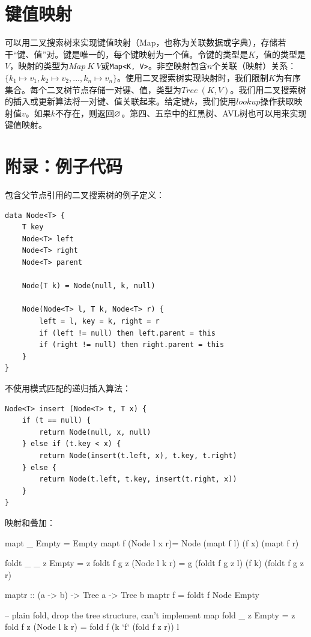 \documentclass[b5paper]{ctexart}
\begin{document}
\begin{Exercise}
\end{Exercise}

\section{键值映射}
可以用二叉搜索树来实现键值映射（Map，也称为关联数据或字典），存储若干“键、值”对。键是唯一的，每个键映射为一个值。令键的类型是$K$，值的类型是$V$，映射的类型为$Map\ K\ V$或\texttt{Map<K, V>}。非空映射包含$n$个关联（映射）关系：$\{k_1 \mapsto v_1, k_2 \mapsto v_2, ..., k_n \mapsto v_n\}$。使用二叉搜索树实现映射时，我们限制$K$为有序集合。每个二叉树节点存储一对键、值，类型为$Tree\ (K, V)$。我们用二叉搜索树的插入或更新算法将一对键、值关联起来。给定键$k$，我们使用$lookup$操作获取映射值$v$。如果$k$不存在，则返回$\varnothing$。第四、五章中的红黑树、AVL树也可以用来实现键值映射。

\section{附录：例子代码}

包含父节点引用的二叉搜索树的例子定义：

\lstset{language=Bourbaki, frame=single}
\begin{lstlisting}
data Node<T> {
    T key
    Node<T> left
    Node<T> right
    Node<T> parent

    Node(T k) = Node(null, k, null)

    Node(Node<T> l, T k, Node<T> r) {
        left = l, key = k, right = r
        if (left != null) then left.parent = this
        if (right != null) then right.parent = this
    }
}
\end{lstlisting}

不使用模式匹配的递归插入算法：

\begin{lstlisting}
Node<T> insert (Node<T> t, T x) {
    if (t == null) {
        return Node(null, x, null)
    } else if (t.key < x) {
        return Node(insert(t.left, x), t.key, t.right)
    } else {
        return Node(t.left, t.key, insert(t.right, x))
    }
}
\end{lstlisting}

映射和叠加：
\begin{Haskell}
mapt _ Empty = Empty
mapt f (Node l x r)= Node (mapt f l) (f x) (mapt f r)

foldt _ _ z Empty = z
foldt f g z (Node l k r) = g (foldt f g z l) (f k) (foldt f g z r)

maptr :: (a -> b) -> Tree a -> Tree b
maptr f = foldt f Node Empty

-- plain fold, drop the tree structure, can't implement map
fold _ z Empty = z
fold f z (Node l k r) = fold f (k `f` (fold f z r)) l
\end{Haskell}
\end{document}
